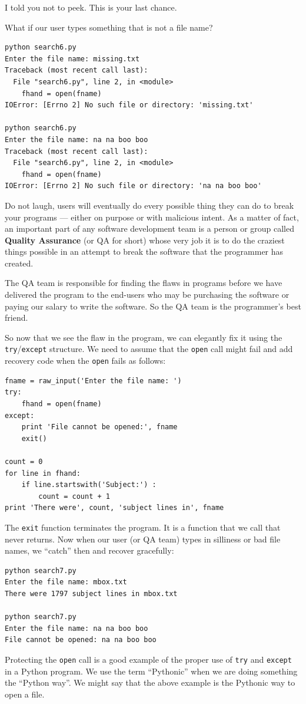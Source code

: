 \documentclass[10pt]{book}
\begin{document}
I told you not to peek.  This is your last chance.

What if our user types something that is not a file name?
\beforeverb
\begin{verbatim}
python search6.py 
Enter the file name: missing.txt
Traceback (most recent call last):
  File "search6.py", line 2, in <module>
    fhand = open(fname)
IOError: [Errno 2] No such file or directory: 'missing.txt'

python search6.py 
Enter the file name: na na boo boo
Traceback (most recent call last):
  File "search6.py", line 2, in <module>
    fhand = open(fname)
IOError: [Errno 2] No such file or directory: 'na na boo boo'
\end{verbatim}
\afterverb
%
Do not laugh, users will eventually do every possible thing they can do 
to break your programs --- either on purpose or with malicious intent.
As a matter of fact, an important part of any software development
team is a person or group called {\bf Quality Assurance} (or QA for short)
whose very job it is to do the craziest things possible in an attempt
to break the software that the programmer has created.

The QA team is responsible for finding the flaws in programs before 
we have delivered the program to the end-users who may be purchasing the
software or paying our salary to write the software.  So the QA team
is the programmer's best friend.

So now that we see the flaw in the program, we can elegantly fix it using
the {\tt try}/{\tt except} structure.  We need to assume that the {\tt open}
call might fail and add recovery code when the {\tt open} fails
as follows:

\beforeverb
\begin{verbatim}
fname = raw_input('Enter the file name: ')
try:
    fhand = open(fname)
except:
    print 'File cannot be opened:', fname
    exit()

count = 0
for line in fhand:
    if line.startswith('Subject:') : 
        count = count + 1
print 'There were', count, 'subject lines in', fname
\end{verbatim}
\afterverb
%
The {\tt exit} function terminates the program.  It is a function
that we call that never returns.  Now when our user (or 
QA team) types in silliness or bad file names, 
we ``catch'' then and recover gracefully:
\beforeverb
\begin{verbatim}
python search7.py
Enter the file name: mbox.txt
There were 1797 subject lines in mbox.txt

python search7.py
Enter the file name: na na boo boo
File cannot be opened: na na boo boo
\end{verbatim}
\afterverb
%
Protecting the {\tt open} call is a good example 
of the proper use of {\tt try}
and {\tt except} in a Python program.  We use the term
``Pythonic'' when we are doing something the ``Python
way''.  We might say that the above example is 
the Pythonic way to open a file.
\end{document}
